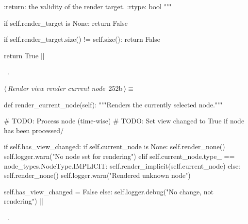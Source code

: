 \documentclass[%
    a4paper,    %
    justified,  %
    nobib,      %
    openany     %
]{tufte-book}
\makeatletter
\renewcommand{\label}[1]{\@tufte@label{##1}}%
\makeatother
\begin{document}
\begin{fullwidth}
\begin{flushleft}
\begin{minipage}{\linewidth}
\begin{pythoncode}
    :return: the validity of the render target.
    :rtype:  bool
    """

    if self.render_target is None:
        return False

    if self.render_target.size() != self.size():
        return False

    return True
|\NWsep|
\end{pythoncode}
\vspace{1.5ex}
\footnotesize
\begin{list}{}{\setlength{\itemsep}{-\parsep}\setlength{\itemindent}{-\leftmargin}}
\item \NWtxtMacroRefIn\ .

\item{}
\end{list}
\end{minipage}\vspace{4ex}
\end{flushleft}
\begin{flushleft} \small
\begin{minipage}{\linewidth}\label{scrap277}\raggedright\small
{} $\langle\,${\itshape Render view render current node}\nobreak\ {\footnotesize {252b}}$\,\rangle\equiv$
\vspace{-1ex}
\begin{pythoncode}
def render_current_node(self):
    """Renders the currently selected node."""

    # TODO: Process node (time-wise)
    # TODO: Set view changed to True if node has been processed/

    if self.has_view_changed:
        if self.current_node is None:
            self.render_none()
            self.logger.warn("No node set for rendering")
        elif self.current_node.type_ == node_types.NodeType.IMPLICIT:
            self.render_implicit(self.current_node)
        else:
            self.render_none()
            self.logger.warn("Rendered unknown node")

        self.has_view_changed = False
    else:
        self.logger.debug("No change, not rendering")
|\NWsep|
\end{pythoncode}
\vspace{1.5ex}
\footnotesize
\begin{list}{}{\setlength{\itemsep}{-\parsep}\setlength{\itemindent}{-\leftmargin}}
\item \NWtxtMacroRefIn\ .


\end{list}
\end{minipage}
\end{flushleft}
\end{fullwidth}
\end{document}
